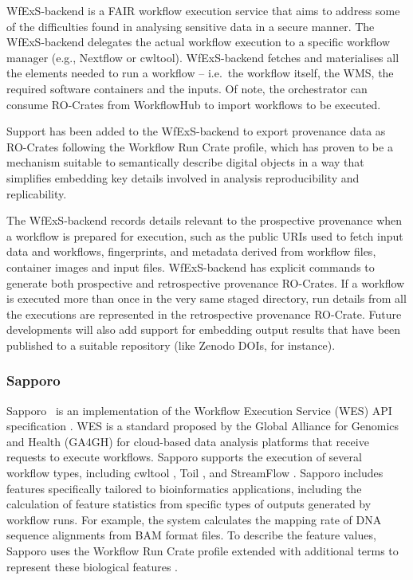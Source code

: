 WfExS-backend  is a FAIR workflow execution service that aims to address some of the difficulties found in analysing sensitive data in a secure manner.
The WfExS-backend delegates the actual workflow execution to a specific workflow manager (e.g., Nextflow or cwltool).
WfExS-backend fetches and materialises all the elements needed to run a workflow -- i.e.~the workflow itself, the WMS, the required software containers and the inputs.
Of note, the orchestrator can consume RO-Crates from WorkflowHub to import workflows to be executed.

Support has been added to the WfExS-backend to export provenance data as RO-Crates following the Workflow Run Crate profile, which has proven to be a mechanism suitable to semantically describe digital objects in a way that simplifies embedding key details involved in analysis reproducibility and replicability.

The WfExS-backend records details relevant to the prospective provenance when a workflow is prepared for execution, such as the public URIs used to fetch input data and workflows, fingerprints, and metadata derived from workflow files, container images and input files.
WfExS-backend has explicit commands to generate both prospective and retrospective provenance RO-Crates.
If a workflow is executed more than once in the very same staged directory, run details from all the executions are represented in the retrospective provenance RO-Crate.
Future developments will also add support for embedding output results that have been published to a suitable repository (like Zenodo DOIs, for instance).

\subsubsection{Sapporo}\label{ch54:sapporo}

Sapporo~\cite{Suetake 2022a} is an implementation of the Workflow Execution Service (WES) API specification \cite{Magee 2018}.
WES is a standard proposed by the Global Alliance for Genomics and Health (GA4GH) for cloud-based data analysis platforms that receive requests to execute workflows.
Sapporo supports the execution of several workflow types, including cwltool \cite{Amstutz 2023}, Toil \cite{Vivian 2017}, and StreamFlow \cite{Colonnelli 2020}.
Sapporo includes features specifically tailored to bioinformatics applications, including the calculation of feature statistics from specific types of outputs generated by workflow runs.
For example, the system calculates the mapping rate of DNA sequence alignments from BAM format files.
To describe the feature values, Sapporo uses the Workflow Run Crate profile extended with additional terms to represent these biological features .

